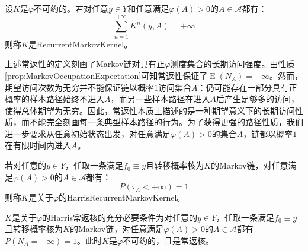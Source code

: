 \begin{definition}
	设$K$是$\varphi$不可约的。若对任意$y\in Y$和任意满足$\varphi(A)>0$的$A\in\mathscr{A}$都有：
	\begin{equation*}
		\sum_{n=1}^{+\infty}K^n(y,A)=+\infty
	\end{equation*}
	则称$K$是\gls{RecurrentMarkovKernel}。
\end{definition}
上述常返性的定义刻画了Markov链对具有正$\varphi$测度集合的长期访问强度。由性质\ref{prop:MarkovOccupationExpectation}可知常返性保证了$\operatorname{E}(N_A)=+\infty$。然而，期望访问次数为无穷并不能保证链以概率$1$访问集合$A$：仍可能存在一部分具有正概率的样本路径始终不进入$A$，而另一些样本路径在进入$A$后产生足够多的访问，使得总体期望为无穷。因此，常返性本质上描述的是一种期望意义下的长期访问性质，而不能完全刻画每一条典型样本路径的行为。为了获得更强的路径性质，我们进一步要求从任意初始状态出发，对任意满足$\varphi(A)>0$的集合$A$，链都以概率$1$在有限时间内进入$A$。
\begin{definition}
	若对任意的$y\in Y$，任取一条满足$f_0\equiv y$且转移概率核为$K$的Markov链，对任意满足$\varphi(A)>0$的$A\in\mathscr{A}$都有：
	\begin{equation*}
		P(\tau_A<+\infty)=1
	\end{equation*}
	则称$K$是关于$\varphi$的\gls{HarrisRecurrentMarkovKernel}。
\end{definition}
\begin{theorem}\label{theo:HarrisRecurrenceVisits}
	$K$是关于$\varphi$的Harris常返核的充分必要条件为对任意的$y\in Y$，任取一条满足$f_0\equiv y$且转移概率核为$K$的Markov链，对任意满足$\varphi(A)>0$的$A\in\mathscr{A}$都有$P(N_A=+\infty)=1$。此时$K$是$\varphi$不可约的，且是常返核。
\end{theorem}
